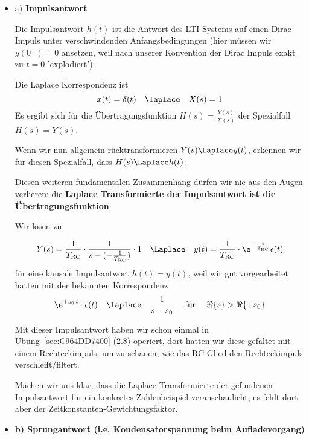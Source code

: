 \begin{Loesung}


\begin{itemize}
  \item a) \textbf{Impulsantwort}

  Die Impulsantwort $h(t)$ ist die Antwort des LTI-Systems auf einen Dirac Impuls unter
  verschwindenden Anfangsbedingungen (hier müssen wir $y(0_-)=0$ ansetzen, weil
  nach unserer Konvention der Dirac Impuls exakt zu $t=0$ 'explodiert').

  Die Laplace Korrespondenz ist
  \begin{equation}
  x(t)=\delta(t) \quad\laplace\quad X(s) = 1
  \end{equation}
  Es ergibt sich für die Übertragungsfunktion $H(s)=\frac{Y(s)}{X(s)}$
  der Spezialfall $H(s)=Y(s)$.

  Wenn wir nun allgemein rücktransformieren $Y(s) \Laplace y(t)$, erkennen wir
  für diesen Spezialfall, dass $H(s) \Laplace h(t)$.

  Diesen weiteren fundamentalen Zusammenhang dürfen wir nie aus den Augen verlieren:
  die \textbf{Laplace Transformierte der Impulsantwort ist die Übertragungsfunktion}

  Wir lösen zu

  \begin{align}
  Y(s) = \frac{1}{T_\mathrm{RC}}\cdot\frac{1}{s - (-\frac{1}{T_\mathrm{RC}})} \cdot 1
  \quad\Laplace\quad
  y(t) = \frac{1}{T_\mathrm{RC}} \cdot \e^{-\frac{t}{T_\mathrm{RC}}} \epsilon(t)
  \end{align}
  für eine kausale Impulsantwort $h(t)=y(t)$, weil wir gut vorgearbeitet hatten
  mit der bekannten Korrespondenz
  \begin{align}
  \e^{+s_0 \, t} \cdot \epsilon(t) \quad \laplace \quad \frac{1}{s-s_0} \quad\text{ für } \quad\Re\{s\} > \Re\{+s_0\}
  \end{align}

  Mit dieser Impulsantwort haben wir schon einmal in Übung~\ref{sec:C964DD7400} (2.8) operiert, dort
  hatten wir diese gefaltet mit einem Rechteckimpuls, um zu schauen, wie das RC-Glied
  den Rechteckimpuls verschleift/filtert.

  Machen wir uns klar, dass 
  die Laplace Transformierte der gefundenen Impulsantwort für ein konkretes
  Zahlenbeispiel veranschaulicht, es fehlt dort aber der Zeitkonstanten-Gewichtungsfaktor.

  \item \textbf{b) Sprungantwort (i.e. Kondensatorspannung beim Aufladevorgang)}


\end{itemize}
\end{Loesung}
